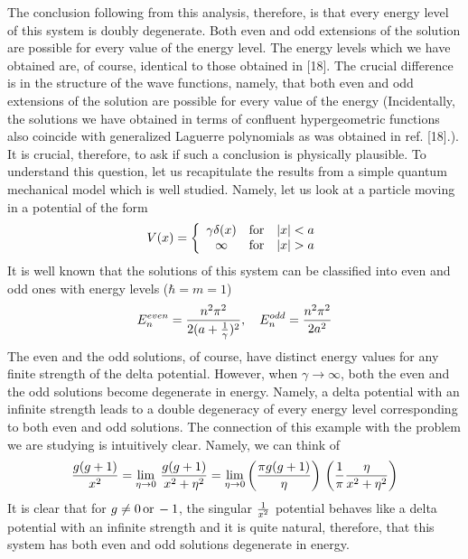 \documentclass[a4paper,11pt]{article}
\begin{document}
The conclusion following from this analysis, therefore, is that every
energy level of this system is doubly degenerate. Both even and odd
extensions of the solution are possible for every value of the energy
level. The energy levels which we have obtained are, of course,
identical to those obtained in [18]. The crucial difference is in the
structure of the wave functions, namely, that both even and odd
extensions of the solution are possible for every value of the
energy (Incidentally, the solutions we have obtained in terms of
confluent hypergeometric functions also coincide with generalized
Laguerre polynomials as was obtained in ref. [18].). It is crucial,
therefore, to ask if such a conclusion is
physically plausible. To understand this question, let us recapitulate
the results from a simple quantum mechanical model which is well
studied. Namely, let us look at a particle moving in a potential of
the form
\[
V(x) = \left\{\begin{array}{cll}
              \gamma \delta(x) & {\rm for} & |x|<a\\
              \infty & {\rm for} & |x|>a
              \end{array}\right.
\]
It is well known that the solutions of this system can be classified
into even and odd ones with energy levels ($\hbar=m=1$)
\[
E_{n}^{even} = \frac{n^{2}\pi^{2}}{2(a+{1\over
\gamma})^{2}},\quad
E_{n}^{odd} = \frac{n^{2}\pi^{2}}{2a^{2}}
\]
The even and the odd solutions, of course, have distinct energy values for
any finite strength of the delta potential. However, when
$\gamma\rightarrow\infty$, both the even and the odd solutions become
degenerate in energy. Namely, a delta potential with an infinite
strength leads to a double degeneracy of every energy level corresponding
to both even and odd solutions. The connection of this example with
the problem we are studying is intuitively clear. Namely, we can think
of
\[
{g(g+1)\over x^{2}} = \lim_{\eta\rightarrow 0}\,{g(g+1)\over
x^{2}+\eta^{2}} = \lim_{\eta\rightarrow 0}\left({\pi g(g+1)\over
\eta}\right)\,\left({1\over \pi}{\eta\over x^{2}+\eta^{2}}\right)
\]
It is clear that for $g\neq 0\,{\rm or}\,-1$, the singular ${1\over x^{2}}$
potential behaves like a delta potential with an infinite strength and
it is quite natural, therefore, that this system has both even and odd
solutions degenerate in energy.
\end{document}
